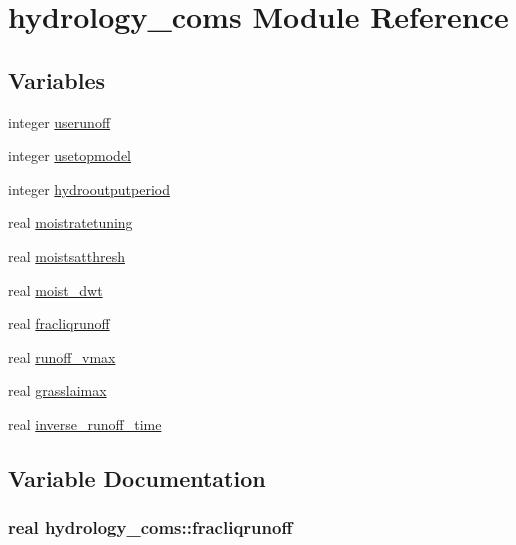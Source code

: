 \hypertarget{namespacehydrology__coms}{}\section{hydrology\+\_\+coms Module Reference}
\label{namespacehydrology__coms}
\subsection*{Variables}
\begin{DoxyCompactItemize}
\item 
integer \hyperlink{namespacehydrology__coms_a072b19b9aec29e8e63c2ad3786bbf6b5}{userunoff}
\item 
integer \hyperlink{namespacehydrology__coms_a20c98af9cfbbd7e0d75c0d2a421fbec7}{usetopmodel}
\item 
integer \hyperlink{namespacehydrology__coms_a348ebb6cbfa8e8217dca91c1e910a611}{hydrooutputperiod}
\item 
real \hyperlink{namespacehydrology__coms_a65f54a2e7ea5015b08a837fd9ffce040}{moistratetuning}
\item 
real \hyperlink{namespacehydrology__coms_a9d7e7e6a1aef383c309cba9b4670a677}{moistsatthresh}
\item 
real \hyperlink{namespacehydrology__coms_aa462c5cf44e4b6d6514539ea959dc840}{moist\+\_\+dwt}
\item 
real \hyperlink{namespacehydrology__coms_a4b086e4a697e284b38cf48df23d29c65}{fracliqrunoff}
\item 
real \hyperlink{namespacehydrology__coms_aa205de3a162ef0ad0200c32e36714a60}{runoff\+\_\+vmax}
\item 
real \hyperlink{namespacehydrology__coms_ab41659cd5c15da7c08da30a343a71d89}{grasslaimax}
\item 
real \hyperlink{namespacehydrology__coms_a1bb2a2286d85f992ccf8dd104ba036a3}{inverse\+\_\+runoff\+\_\+time}
\end{DoxyCompactItemize}


\subsection{Variable Documentation}
\hypertarget{namespacehydrology__coms_a4b086e4a697e284b38cf48df23d29c65}{}
\subsubsection[{fracliqrunoff}]{\setlength{\rightskip}{0pt plus 5cm}real hydrology\+\_\+coms\+::fracliqrunoff}\label{namespacehydrology__coms_a4b086e4a697e284b38cf48df23d29c65}
\hypertarget{namespacehydrology__coms_ab41659cd5c15da7c08da30a343a71d89}{}
